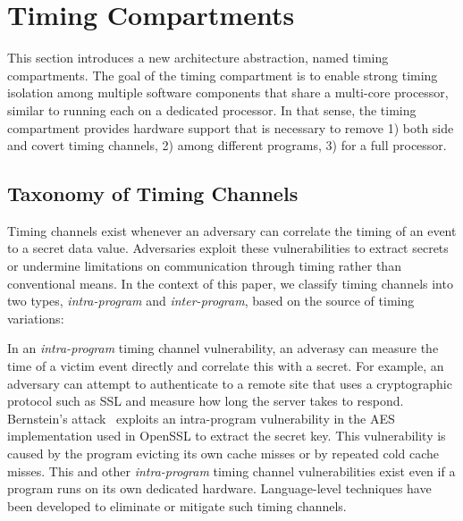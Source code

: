\section{Timing Compartments}

This section introduces a new architecture abstraction, named timing 
compartments.
The goal of the timing compartment is to enable strong timing isolation
among multiple software components that share a multi-core processor,
similar to running each on a dedicated processor.
In that sense, the timing compartment provides hardware support that is 
necessary to remove 1) both side and covert timing channels, 2) among
different programs, 3) for a full processor.


\subsection{Taxonomy of Timing Channels}

Timing channels exist whenever an adversary can correlate the timing of an event
to a secret data value. Adversaries exploit these vulnerabilities to extract 
secrets or undermine limitations on communication through timing rather than 
conventional means. In the context of this paper, we classify timing channels
into two types, {\em intra-program} and {\em inter-program}, 
based on the source of timing variations:

In an {\em intra-program} timing channel vulnerability, an adverasy can measure 
the time of a victim event directly and correlate this with a secret. For 
example, an adversary can attempt to authenticate to a remote site that uses a 
cryptographic protocol such as SSL and measure how long the server takes to 
respond. Bernstein's attack~\cite{bernstein} exploits an intra-program 
vulnerability in the AES implementation used in OpenSSL to extract the secret 
key. This vulnerability is caused by the program evicting its 
own cache misses or by repeated cold cache misses.
This and other {\em intra-program} timing channel vulnerabilities
exist even if a program runs on its own dedicated hardware.
Language-level techniques have been developed to
eliminate \cite{timesens} or mitigate \cite{mitigation1,mitigation2,mitigation3} 
such timing channels.


